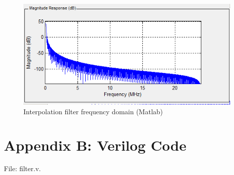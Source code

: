 \documentclass[a4paper,twoside,11pt, fleqn]{article}
\begin{document}
\begin{figure}[h]
	\includegraphics[scale=0.67]{Images/frequencyplot}
    \caption{Interpolation filter frequency domain (Matlab)}
    \label{fig:frq}
\end{figure}

\newpage
\section{Appendix B: Verilog Code}
File: filter.v.
\begin{lstlisting}[language=Verilog]

\end{lstlisting}
\end{document}
